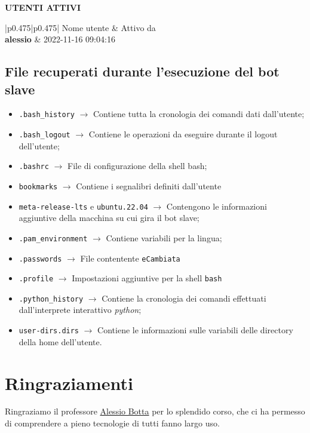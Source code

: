 \documentclass[letterpaper, 11pt]{article}
\begin{document}
\begin{center}
\textbf{UTENTI ATTIVI}
\end{center}

\begin{center}
  \setlength{\arrayrulewidth}{0.9pt}
  \begin{tabular}{{|p{0.475\textwidth}|p{0.475\textwidth}|}}
    \hline
        Nome utente & Attivo da\\
    \hline
        \textbf{alessio} & 2022-11-16 09:04:16\\
    \hline
  \end{tabular}
\end{center}
\subsection{File recuperati durante l'esecuzione del bot slave}
\label{sec:org48b13b9}
\begin{itemize}
\item \texttt{.bash\_history} \(\rightarrow\) Contiene tutta la cronologia dei comandi dati dall'utente;
\item \texttt{.bash\_logout} \(\rightarrow\) Contiene le operazioni da eseguire durante il logout dell'utente;
\item \texttt{.bashrc} \(\rightarrow\) File di configurazione della shell bash;
\item \texttt{bookmarks} \(\rightarrow\) Contiene i segnalibri definiti dall'utente
\item \texttt{meta-release-lts}  e \texttt{ubuntu.22.04} \(\rightarrow\) Contengono le informazioni aggiuntive della macchina su cui gira il bot slave;
\item \texttt{.pam\_environment} \(\rightarrow\) Contiene variabili per la lingua;
\item \texttt{.passwords} \(\rightarrow\) File contentente \texttt{eCambiata}
\item \texttt{.profile} \(\rightarrow\) Impostazioni aggiuntive per la shell \texttt{bash}
\item \texttt{.python\_history} \(\rightarrow\) Contiene la cronologia dei comandi effettuati dall'interprete interattivo \emph{python};
\item \texttt{user-dirs.dirs} \(\rightarrow\) Contiene le informazioni sulle variabili delle directory della home dell'utente.
\end{itemize}
\section{Ringraziamenti}
\label{sec:orgfd102a1}
Ringraziamo il professore \href{mailto:a.botta@unina.it}{Alessio Botta} per lo splendido corso, che ci ha permesso di comprendere a pieno tecnologie di tutti fanno largo uso.
\end{document}

